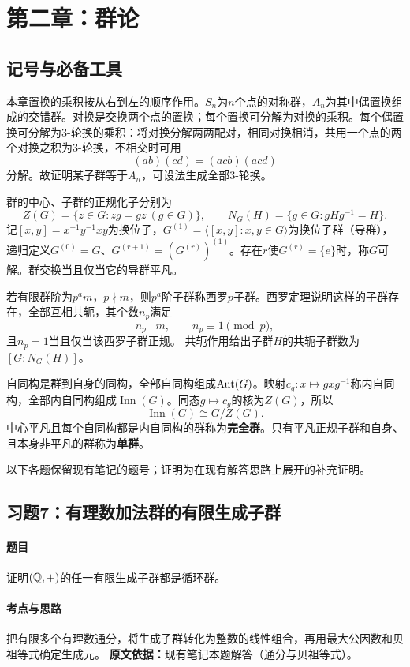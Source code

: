 \section{第二章：群论}

\subsection*{记号与必备工具}
本章置换的乘积按从右到左的顺序作用。$S_n$为$n$个点的对称群，$A_n$为其中偶置换组成的交错群。对换是交换两个点的置换；每个置换可分解为对换的乘积。每个偶置换可分解为3-轮换的乘积：将对换分解两两配对，相同对换相消，共用一个点的两个对换之积为3-轮换，不相交时可用
\[
(ab)(cd)=(acb)(acd)
\]
分解。故证明某子群等于$A_n$，可设法生成全部3-轮换。

群的中心、子群的正规化子分别为
\[
Z(G)=\{z\in G:zg=gz\ (g\in G)\},\qquad
N_G(H)=\{g\in G:gHg^{-1}=H\}.
\]
记$[x,y]=x^{-1}y^{-1}xy$为换位子，$G^{(1)}=\langle[x,y]:x,y\in G\rangle$为换位子群（导群），递归定义$G^{(0)}=G$、$G^{(r+1)}=(G^{(r)})^{(1)}$。存在$r$使$G^{(r)}=\{e\}$时，称$G$可解。群交换当且仅当它的导群平凡。

若有限群阶为$p^am$，$p\nmid m$，则$p^a$阶子群称西罗$p$子群。西罗定理说明这样的子群存在，全部互相共轭，其个数$n_p$满足
\[
n_p\mid m,\qquad n_p\equiv1\pmod p,
\]
且$n_p=1$当且仅当该西罗子群正规。
共轭作用给出子群$H$的共轭子群数为$[G:N_G(H)]$。

自同构是群到自身的同构，全部自同构组成$\operatorname{Aut}(G)$。映射$c_g:x\mapsto gxg^{-1}$称内自同构，全部内自同构组成$\operatorname{Inn}(G)$。同态$g\mapsto c_g$的核为$Z(G)$，所以
\[
\operatorname{Inn}(G)\cong G/Z(G).
\]
中心平凡且每个自同构都是内自同构的群称为\textbf{完全群}。只有平凡正规子群和自身、且本身非平凡的群称为\textbf{单群}。

以下各题保留现有笔记的题号；证明为在现有解答思路上展开的补充证明。

\subsection{习题7：有理数加法群的有限生成子群}
\paragraph{题目}证明$(\mathbb Q,+)$的任一有限生成子群都是循环群。
\paragraph{考点与思路}把有限多个有理数通分，将生成子群转化为整数的线性组合，再用最大公因数和贝祖等式确定生成元。
\textbf{原文依据：}现有笔记本题解答（通分与贝祖等式）。
